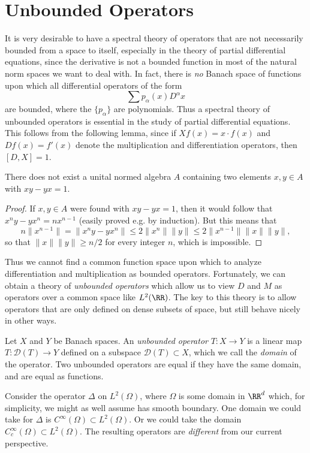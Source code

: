 \chapter{Unbounded Operators}

It is very desirable to have a spectral theory of operators that are not necessarily bounded from a space to itself, especially in the theory of partial differential equations, since the derivative is not a bounded function in most of the natural norm spaces we want to deal with. In fact, there is \emph{no} Banach space of functions upon which all differential operators of the form
%
\[ \sum p_\alpha(x) D^\alpha x \]
%
are bounded, where the $\{ p_\alpha \}$ are polynomials. Thus a spectral theory of unbounded operators is essential in the study of partial differential equations. This follows from the following lemma, since if $Xf(x) = x \cdot f(x)$ and $Df(x) = f'(x)$ denote the multiplication and differentiation operators, then $[D,X] = 1$.

\begin{lemma}
    There does not exist a unital normed algebra $A$ containing two elements $x,y \in A$ with $xy - yx = 1$.
\end{lemma}
\begin{proof}
    If $x,y \in A$ were found with $xy - yx = 1$, then it would follow that $x^n y - yx^n = nx^{n-1}$ (easily proved e.g. by induction). But this means that
    \[ n \| x^{n-1} \| = \| x^n y - yx^n \| \leq 2 \| x^n \| \| y \| \leq 2 \| x^{n-1} \| \| x \| \| y \|, \]
    so that $\| x \| \| y \| \geq n/2$ for every integer $n$, which is impossible.
\end{proof}

Thus we cannot find a common function space upon which to analyze differentiation and multiplication as bounded operators. Fortunately, we can obtain a theory of \emph{unbounded operators} which allow us to view $D$ and $M$ as operators over a common space like $L^2(\RR)$. The key to this theory is to allow operators that are only defined on dense subsets of space, but still behave nicely in other ways.

Let $X$ and $Y$ be Banach spaces. An \emph{unbounded operator} $T: X \to Y$ is a linear map $T: \mathcal{D}(T) \to Y$ defined on a subspace $\mathcal{D}(T) \subset X$, which we call the \emph{domain} of the operator. Two unbounded operators are equal if they have the same domain, and are equal as functions.

\begin{example}
    Consider the operator $\Delta$ on $L^2(\Omega)$, where $\Omega$ is some domain in $\RR^d$ which, for simplicity, we might as well assume has smooth boundary. One domain we could take for $\Delta$ is $C^\infty(\Omega) \subset L^2(\Omega)$. Or we could take the domain $C_c^\infty(\Omega) \subset L^2(\Omega)$. The resulting operators are \emph{different} from our current perspective.
\end{example}

